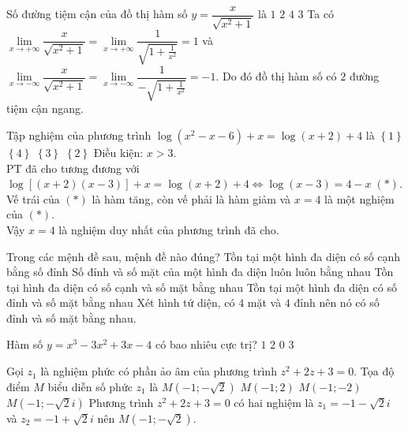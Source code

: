 \begin{ex}%
Số đường tiệm cận của đồ thị hàm số $y =\dfrac{x}{\sqrt {x^2 + 1}}$ là
\choice
{$1$}
{\True $2$}
{$4$}
{$3$}
\loigiai
{Ta có $\lim\limits_{x \to  +\infty} \dfrac {x}{\sqrt{x^2 + 1}} = \lim\limits_{x \to  +\infty } \dfrac {1}{\sqrt {1 + \frac {1}{x^2}}}=1$ và $\lim\limits_{x \to  -\infty} \dfrac {x}{\sqrt{x^2 + 1}} = \lim\limits_{x \to  -\infty } \dfrac {1}{-\sqrt {1 + \frac {1}{x^2}}}=-1$. Do đó đồ thị hàm số có $2$ đường tiệm cận ngang.}
\end{ex}

\begin{ex}%
Tập nghiệm của phương trình $\log \left(x^2-x-6\right)+x = \log\left(x+2\right)+4$ là
\choice
{$\left\{1\right\}$}
{\True $\left\{4\right\}$}
{$\left\{3\right\}$}
{$\left\{2\right\}$}
\loigiai
{
Điều kiện: $x>3$.\\PT đã cho tương đương với $\log \left[\left(x+2\right)\left(x-3\right)\right]+x=\log\left(x+2\right)+4\Leftrightarrow \log (x-3)=4-x\;(*)$.\\Vế trái của $(*)$ là hàm tăng, còn vế phải là hàm giảm và $x=4$ là một nghiệm của $(*)$.\\Vậy $x=4$ là nghiệm duy nhất của phương trình đã cho.}
\end{ex}

\begin{ex}%
Trong các mệnh đề sau, mệnh đề nào đúng?
\choice
{Tồn tại một hình đa diện có số cạnh bằng số đỉnh}
{Số đỉnh và số mặt của một hình đa diện luôn luôn bằng nhau}
{Tồn tại hình đa diện có số cạnh và số mặt bằng nhau}
{\True Tồn tại một hình đa diện có số đỉnh và số mặt bằng nhau}
\loigiai
{Xét hình tứ diện, có $4$ mặt và $4$ đỉnh nên nó có số đỉnh và số mặt bằng nhau.}
\end{ex}

\begin{ex}%
Hàm số $y=x^3-3x^2+3x-4$ có bao nhiêu cực trị?
\choice
{$1$}
{$2$}
{\True $0$}
{$3$}
\end{ex}

\begin{ex}%
Gọi $z_1$ là nghiệm phức có phần ảo âm của phương trình $z^2+2z+3=0$. Tọa độ điểm $M$ biểu diễn số phức $z_1$  là
\choice
{\True $M\left(-1;-\sqrt{2}\right)$}
{$M\left(-1;2\right)$}
{$M\left(-1;-2\right)$}
{$M\left(-1;-\sqrt{2}i\right)$}
\loigiai
{Phương trình $z^2+2z+3=0$ có hai nghiệm là $z_1=-1-\sqrt{2}i$ và $z_2=-1+\sqrt{2}i$ nên $M\left(-1;-\sqrt{2}\right)$.}
\end{ex}

